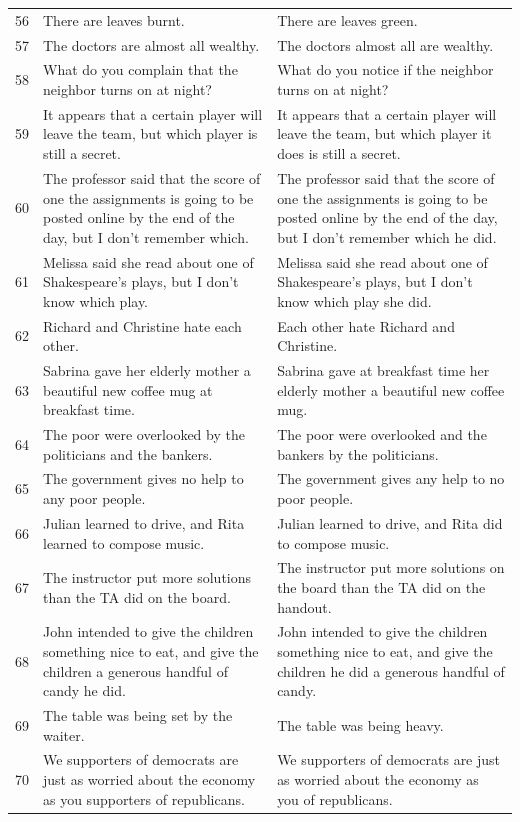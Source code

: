 \documentclass[doc]{apa6}
\begin{document}
\begin{small}
\begin{longtable}{p{1cm} | p{8.5cm} | p{8.5cm}}
56 & There are leaves burnt. & There are leaves green.\\
57 & The doctors are almost all wealthy. & The doctors almost all are wealthy.\\
58 & What do you complain that the neighbor turns on at night? & What do you notice if the neighbor turns on at night?\\
59 & It appears that a certain player will leave the team, but which player is still a secret. & It appears that a certain player will leave the team, but which player it does is still a secret.\\
60 & The professor said that the score of one the assignments is going to be posted online by the end of the day, but I don't remember which. & The professor said that the score of one the assignments is going to be posted online by the end of the day, but I don't remember which he did.\\
61 & Melissa said she read about one of Shakespeare's plays, but I don't know which play. & Melissa said she read about one of Shakespeare's plays, but I don't know which play she did.\\
62 & Richard and Christine hate each other. & Each other hate Richard and Christine.\\
63 & Sabrina gave  her elderly mother a beautiful new coffee mug at breakfast time.   & Sabrina gave at breakfast time her elderly mother a beautiful new coffee mug.  \\
64 & The poor were overlooked by the politicians and the bankers. & The poor were overlooked and the bankers by the politicians.\\
65 & The government gives no help to any poor people. & The government gives any help to no poor people.\\
66 & Julian learned to drive, and Rita learned to compose music. & Julian learned to drive, and Rita did to compose music.\\
67 & The instructor put more solutions than the TA did on the board. & The instructor put more solutions on the board than the TA did on the handout.\\
68 & John intended to give the children something nice to eat, and give the children a generous handful of candy he did. & John intended to give the children something nice to eat, and give the children he did a generous handful of candy.\\
69 & The table was being set by the waiter. & The table was being heavy.\\
70 & We supporters of democrats are just as worried about the economy as you supporters of republicans. & We supporters of democrats are just as worried about the economy as you of republicans.\\

\end{longtable}
\end{small}
\end{document}
